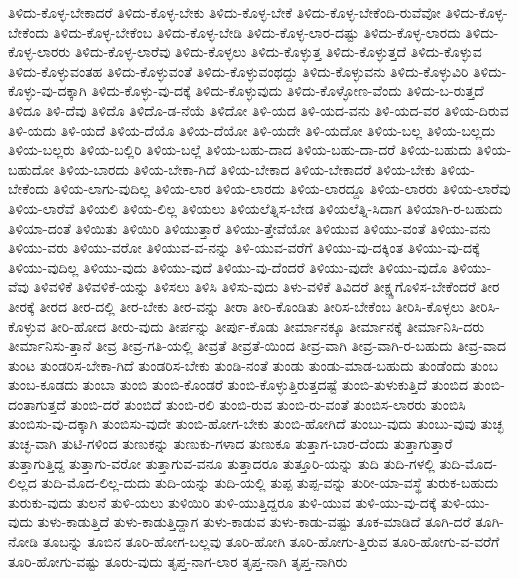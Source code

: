 {ತಿಳಿದು-ಕೊಳ್ಳ-ಬೇಕಾದರೆ
ತಿಳಿದು-ಕೊಳ್ಳ-ಬೇಕು
ತಿಳಿದು-ಕೊಳ್ಳ-ಬೇಕೆ
ತಿಳಿದು-ಕೊಳ್ಳ-ಬೇಕೆಂದಿ-ರುವೆವೋ
ತಿಳಿದು-ಕೊಳ್ಳ-ಬೇಕೆಂದು
ತಿಳಿದು-ಕೊಳ್ಳ-ಬೇಕೆಂಬ
ತಿಳಿದು-ಕೊಳ್ಳ-ಬೇಡಿ
ತಿಳಿದು-ಕೊಳ್ಳ-ಲಾರ-ದಷ್ಟು
ತಿಳಿದು-ಕೊಳ್ಳ-ಲಾರದು
ತಿಳಿದು-ಕೊಳ್ಳ-ಲಾರರು
ತಿಳಿದು-ಕೊಳ್ಳ-ಲಾರೆವು
ತಿಳಿದು-ಕೊಳ್ಳಲು
ತಿಳಿದು-ಕೊಳ್ಳುತ್ತ
ತಿಳಿದು-ಕೊಳ್ಳುತ್ತದೆ
ತಿಳಿದು-ಕೊಳ್ಳುವ
ತಿಳಿದು-ಕೊಳ್ಳುವಂತಹ
ತಿಳಿದು-ಕೊಳ್ಳುವಂತೆ
ತಿಳಿದು-ಕೊಳ್ಳುವಂಥದ್ದು
ತಿಳಿದು-ಕೊಳ್ಳುವನು
ತಿಳಿದು-ಕೊಳ್ಳುವಿರಿ
ತಿಳಿದು-ಕೊಳ್ಳು-ವು-ದಕ್ಕಾಗಿ
ತಿಳಿದು-ಕೊಳ್ಳು-ವು-ದಕ್ಕೆ
ತಿಳಿದು-ಕೊಳ್ಳುವುದು
ತಿಳಿದು-ಕೊಳ್ಳೋಣ-ವೆಂದು
ತಿಳಿದು-ಬ-ರುತ್ತದೆ
ತಿಳಿದೂ
ತಿಳಿ-ದೆವು
ತಿಳಿದೊ
ತಿಳಿದೊ-ಡ-ನೆಯೆ
ತಿಳಿದೋ
ತಿಳಿ-ಯದ
ತಿಳಿ-ಯದ-ವನು
ತಿಳಿ-ಯದ-ವರ
ತಿಳಿಯ-ದಿರುವ
ತಿಳಿ-ಯದು
ತಿಳಿ-ಯದೆ
ತಿಳಿಯ-ದೆಯೊ
ತಿಳಿಯ-ದೆಯೋ
ತಿಳಿ-ಯದೇ
ತಿಳಿ-ಯದೋ
ತಿಳಿಯ-ಬಲ್ಲ
ತಿಳಿಯ-ಬಲ್ಲದು
ತಿಳಿಯ-ಬಲ್ಲರು
ತಿಳಿಯ-ಬಲ್ಲಿರಿ
ತಿಳಿಯ-ಬಲ್ಲೆ
ತಿಳಿಯ-ಬಹು-ದಾದ
ತಿಳಿಯ-ಬಹು-ದಾ-ದರೆ
ತಿಳಿಯ-ಬಹುದು
ತಿಳಿಯ-ಬಹುದೋ
ತಿಳಿಯ-ಬಾರದು
ತಿಳಿಯ-ಬೇಕಾ-ಗಿದೆ
ತಿಳಿಯ-ಬೇಕಾದ
ತಿಳಿಯ-ಬೇಕಾದರೆ
ತಿಳಿಯ-ಬೇಕು
ತಿಳಿಯ-ಬೇಕೆಂದು
ತಿಳಿಯ-ಲಾಗು-ವುದಿಲ್ಲ
ತಿಳಿಯ-ಲಾರ
ತಿಳಿಯ-ಲಾರದು
ತಿಳಿಯ-ಲಾರದ್ದೂ
ತಿಳಿಯ-ಲಾರರು
ತಿಳಿಯ-ಲಾರೆವು
ತಿಳಿಯ-ಲಾರೆವೆ
ತಿಳಿಯಲಿ
ತಿಳಿಯ-ಲಿಲ್ಲ
ತಿಳಿಯಲು
ತಿಳಿಯಲೆತ್ನಿಸ-ಬೇಡ
ತಿಳಿಯಲೆತ್ನಿ-ಸಿದಾಗ
ತಿಳಿಯಾಗಿ-ರ-ಬಹುದು
ತಿಳಿಯಾ-ದಂತೆ
ತಿಳಿಯಿತು
ತಿಳಿಯಿರಿ
ತಿಳಿಯುತ್ತಾರೆ
ತಿಳಿಯು-ತ್ತೇವೆಯೋ
ತಿಳಿಯುವ
ತಿಳಿಯು-ವಂತೆ
ತಿಳಿಯು-ವನು
ತಿಳಿಯು-ವರು
ತಿಳಿಯು-ವರೋ
ತಿಳಿಯುವ-ವ-ನನ್ನು
ತಿಳಿ-ಯುವ-ವರೆಗೆ
ತಿಳಿಯು-ವು-ದಕ್ಕಿಂತ
ತಿಳಿಯು-ವು-ದಕ್ಕೆ
ತಿಳಿಯು-ವುದಿಲ್ಲ
ತಿಳಿಯು-ವುದು
ತಿಳಿಯು-ವುದೆ
ತಿಳಿಯು-ವು-ದೆಂದರೆ
ತಿಳಿಯು-ವುದೇ
ತಿಳಿಯು-ವುದೊ
ತಿಳಿಯು-ವೆವು
ತಿಳಿವಳಿಕೆ
ತಿಳಿವಳಿಕೆ-ಯನ್ನು
ತಿಳಿಸಲು
ತಿಳಿಸಿ
ತಿಳಿಸು-ವುದು
ತಿಳು-ವಳಿಕೆ
ತಿವಿದರೆ
ತೀಕ್ಷ್ಣಗೊಳಿಸ-ಬೇಕೆಂದರೆ
ತೀರ
ತೀರಕ್ಕೆ
ತೀರದ
ತೀರ-ದಲ್ಲಿ
ತೀರ-ಬೇಕು
ತೀರ-ವನ್ನು
ತೀರಾ
ತೀರಿ-ಕೊಂಡಿತು
ತೀರಿಸ-ಬೇಕೆಂಬ
ತೀರಿಸಿ-ಕೊಳ್ಳಲು
ತೀರಿಸಿ-ಕೊಳ್ಳುವ
ತೀರಿ-ಹೋದ
ತೀರು-ವುದು
ತೀರ್ಪನ್ನು
ತೀರ್ಪು-ಕೊಡು
ತೀರ್ಮಾನಕ್ಕೂ
ತೀರ್ಮಾನಕ್ಕೆ
ತೀರ್ಮಾನಿಸಿ-ದರು
ತೀರ್ಮಾನಿಸು-ತ್ತಾನೆ
ತೀವ್ರ
ತೀವ್ರ-ಗತಿ-ಯಲ್ಲಿ
ತೀವ್ರತೆ
ತೀವ್ರತೆ-ಯಿಂದ
ತೀವ್ರ-ವಾಗಿ
ತೀವ್ರ-ವಾಗಿ-ರ-ಬಹುದು
ತೀವ್ರ-ವಾದ
ತುಂಟ
ತುಂಡರಿಸ-ಬೇಕಾ-ಗಿದೆ
ತುಂಡರಿಸ-ಬೇಕು
ತುಂಡಿ-ನಂತೆ
ತುಂಡು
ತುಂಡು-ಮಾಡ-ಬಹುದು
ತುಂಡೆಂದು
ತುಂಬ
ತುಂಬ-ಕೂಡದು
ತುಂಬಾ
ತುಂಬಿ
ತುಂಬಿ-ಕೊಂಡರೆ
ತುಂಬಿ-ಕೊಳ್ಳುತ್ತಿರುತ್ತದಷ್ಟೆ
ತುಂಬಿ-ತುಳುಕುತ್ತಿದೆ
ತುಂಬಿದ
ತುಂಬಿ-ದಂತಾಗುತ್ತದೆ
ತುಂಬಿ-ದರೆ
ತುಂಬಿದೆ
ತುಂಬಿ-ರಲಿ
ತುಂಬಿ-ರುವ
ತುಂಬಿ-ರು-ವಂತೆ
ತುಂಬಿಸ-ಲಾರರು
ತುಂಬಿಸಿ
ತುಂಬಿಸು-ವು-ದಕ್ಕಾಗಿ
ತುಂಬಿಸು-ವುದೇ
ತುಂಬಿ-ಹೋಗ-ಬೇಕು
ತುಂಬಿ-ಹೋಗಿದೆ
ತುಂಬು-ವುದು
ತುಂಬು-ವುವು
ತುಚ್ಛ
ತುಚ್ಛ-ವಾಗಿ
ತುಟಿ-ಗಳಿಂದ
ತುಣುಕನ್ನು
ತುಣುಕು-ಗಳಾದ
ತುಣುಕೂ
ತುತ್ತಾಗ-ಬಾರ-ದೆಂದು
ತುತ್ತಾಗುತ್ತಾರೆ
ತುತ್ತಾಗುತ್ತಿದ್ದ
ತುತ್ತಾಗು-ವರೋ
ತುತ್ತಾಗುವ-ವನೂ
ತುತ್ತಾದರೂ
ತುತ್ತೂರಿ-ಯನ್ನು
ತುದಿ
ತುದಿ-ಗಳಲ್ಲಿ
ತುದಿ-ಮೊದ-ಲಿಲ್ಲದ
ತುದಿ-ಮೊದ-ಲಿಲ್ಲ-ದುದು
ತುದಿ-ಯನ್ನು
ತುದಿ-ಯಲ್ಲಿ
ತುಪ್ಪ
ತುಪ್ಪ-ವನ್ನು
ತುರೀ-ಯಾ-ವಸ್ಥೆ
ತುರುಕ-ಬಹುದು
ತುರುಕು-ವುದು
ತುಲನೆ
ತುಳಿ-ಯಲು
ತುಳಿಯಿರಿ
ತುಳಿ-ಯುತ್ತಿದ್ದರೂ
ತುಳಿ-ಯುವ
ತುಳಿ-ಯು-ವು-ದಕ್ಕೆ
ತುಳಿ-ಯು-ವುದು
ತುಳು-ಕಾಡುತ್ತಿದೆ
ತುಳು-ಕಾಡುತ್ತಿದ್ದಾಗ
ತುಳು-ಕಾಡುವ
ತುಳು-ಕಾಡು-ವಷ್ಟು
ತೂಕ-ಮಾಡಿದೆ
ತೂಗಿ-ದರೆ
ತೂಗಿ-ನೋಡಿ
ತೂಬನ್ನು
ತೂಬಿನ
ತೂರಿ-ಹೋಗ-ಬಲ್ಲವು
ತೂರಿ-ಹೋಗಿ
ತೂರಿ-ಹೋಗು-ತ್ತಿರುವ
ತೂರಿ-ಹೋಗು-ವ-ವರೆಗೆ
ತೂರಿ-ಹೋಗು-ವಷ್ಟು
ತೂರು-ವುದು
ತೃಪ್ತ-ನಾಗ-ಲಾರ
ತೃಪ್ತ-ನಾಗಿ
ತೃಪ್ತ-ನಾಗಿರು
}
